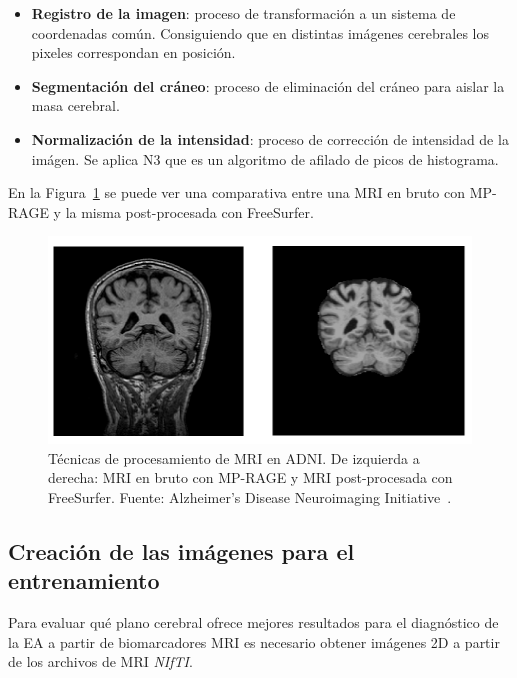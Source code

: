 \begin{itemize}
    \item \textbf{Registro de la imagen}: proceso de transformación a un sistema de coordenadas común.
    Consiguiendo que en distintas imágenes cerebrales los pixeles correspondan en posición.
    \item \textbf{Segmentación del cráneo}: proceso de eliminación del cráneo para aislar la masa cerebral.
    \item \textbf{Normalización de la intensidad}: proceso de corrección de intensidad de la imágen.
    Se aplica N3 que es un algoritmo de afilado de picos de histograma. \\
\end{itemize}

En la Figura~\ref{fig:adni-mri} se puede ver una comparativa entre una MRI en bruto con MP-RAGE y la misma post-procesada con
FreeSurfer.

\begin{figure}[H]
    \centering
    \includegraphics[width=\textwidth]{./imgs/adni-mri}
    \caption{Técnicas de procesamiento de MRI en ADNI. De izquierda a derecha: MRI en bruto con MP-RAGE y MRI
    post-procesada con FreeSurfer. Fuente: Alzheimer’s Disease Neuroimaging Initiative~\cite{img-adni-mri}. }
    \label{fig:adni-mri}
\end{figure}

\subsection{Creación de las imágenes para el entrenamiento}\label{subsec:creacion-de-las-imagenes-para-el-entrenamiento}
Para evaluar qué plano cerebral ofrece mejores resultados para el diagnóstico de la EA a partir de biomarcadores MRI es
necesario obtener imágenes 2D a partir de los archivos de MRI \textit{NIfTI}.

